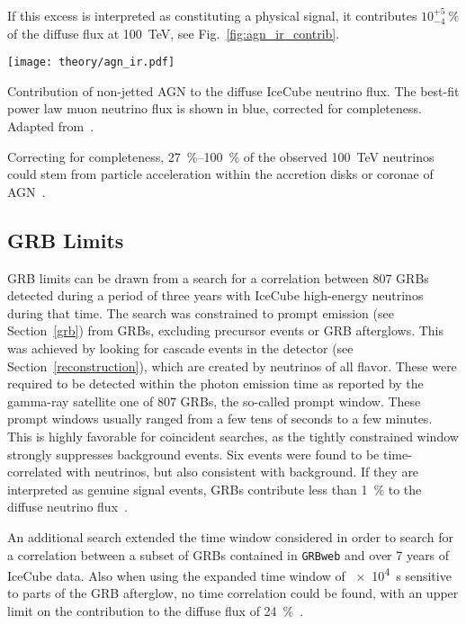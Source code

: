 If this excess is interpreted as constituting a physical signal, it contributes $10^{+5}_{-4} ~\%$ of the diffuse flux at \SI{100}{\tera\eV}, see Fig.~\ref{fig:agn_ir_contrib}.

\begin{marginfigure}
  \texttt{[image: theory/agn\_ir.pdf]}
  \caption[Non-jetted AGN]{Contribution of non-jetted AGN to the diffuse IceCube neutrino flux. The best-fit power law muon neutrino flux is shown in blue, corrected for completeness. Adapted from~\cite{Abbasi2022c}.}
\end{marginfigure}

Correcting for completeness, \SIrange{27}{100}{\percent} of the observed \SI{100}{\tera\eV} neutrinos could stem from particle acceleration within the accretion disks or coronae of AGN~\cite{Abbasi2022c}.

\subsection{GRB Limits}
GRB limits can be drawn from a search for a correlation between 807 GRBs detected during a period of three years with IceCube high-energy neutrinos during that time. The search was constrained to prompt emission (see Section~\ref{grb}) from GRBs, excluding precursor events or GRB afterglows. This was achieved by looking for cascade events in the detector (see Section~\ref{reconstruction}), which are created by neutrinos of all flavor. These were required to be detected within the photon emission time as reported by the gamma-ray satellite one of 807 GRBs, the so-called prompt window. These prompt windows usually ranged from a few tens of seconds to a few minutes. This is highly favorable for coincident searches, as the tightly constrained window strongly suppresses background events. Six events were found to be time-correlated with neutrinos, but also consistent with background. If they are interpreted as genuine signal events, GRBs contribute less than \SI{1}{\percent} to the diffuse neutrino flux~.

An additional search extended the time window considered in order to search for a correlation between a subset of GRBs contained in \texttt{GRBweb} and over 7 years of IceCube data. Also when using the expanded time window of \SI{e4}{s} sensitive to parts of the GRB afterglow, no time correlation could be found, with an upper limit on the contribution to the diffuse flux of \SI{24}{\percent}~.

